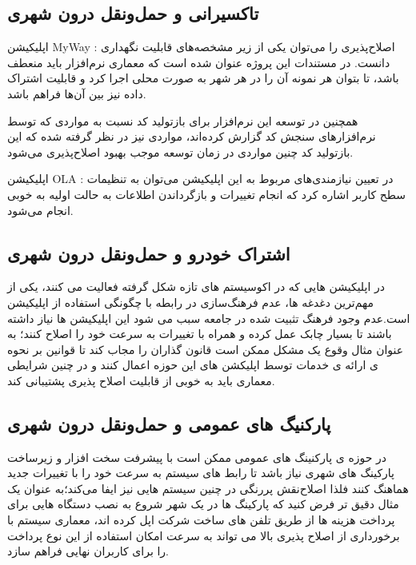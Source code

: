 \subsection{تاکسیرانی و حمل‌و‌نقل درون شهری}

اپلیکیشن MyWay : اصلاح‌پذیری را می‌توان یکی از زیر مشخصه‌های قابلیت‌‌ نگهداری دانست. در مستندات این پروژه عنوان شده است که معماری نرم‌افزار باید منعطف باشد، تا بتوان هر نمونه آن را در هر شهر به صورت محلی اجرا کرد و قابلیت اشتراک داده نیز بین آن‌‌ها فراهم باشد. 

همچنین در توسعه این نرم‌افزار برای باز‌تولید کد نسبت به مواردی که توسط نرم‌افزارهای سنجش کد گزارش کرده‌اند، مواردی نیز در نظر گرفته شده که این باز‌تولید کد چنین مواردی در زمان توسعه موجب بهبود اصلاح‌پذیری می‌شود.

اپلیکیشن OLA : در تعیین نیازمندی‌های مربوط به این اپلیکیشن می‌توان به تنظیمات سطح کاربر اشاره کرد که انجام تغییرات و بازگرداندن اطلاعات به حالت اولیه به خوبی انجام می‌شود.


\subsection{اشتراک خودرو و حمل‌و‌نقل درون شهری}
در اپلیکیشن هایی که در اکوسیستم های تازه شکل گرفته فعالیت می کنند، یکی از مهم‌ترین دغدغه ها، عدم فرهنگ‌سازی در رابطه با چگونگی استفاده از اپلیکیشن است.عدم وجود فرهنگ تثبیت شده در جامعه سبب می شود این اپلیکیشن ها نیاز داشته باشند تا بسیار چابک عمل کرده و همراه با تغییرات به سرعت خود را اصلاح کنند؛ به عنوان مثال وقوع یک مشکل ممکن است قانون گذاران را مجاب کند تا قوانین بر نحوه ی ارائه ی خدمات توسط اپلیکشن های این حوزه اعمال کنند و در چنین شرایطی معماری باید به خوبی از قابلیت اصلاح پذیری پشتیبانی کند.
\subsection{پارکنیگ های عمومی و حمل‌و‌نقل درون شهری}
در حوزه ی پارکنینگ های عمومی ممکن است با پیشرفت سخت افزار و زیر‌ساخت پارکینگ های شهری نیاز باشد تا رابط های سیستم به سرعت خود را با تغییرات جدید هماهنگ کنند فلذا اصلاح‌نقش پررنگی در چنین سیستم هایی نیز ایفا می‌کند؛به عنوان یک مثال دقیق تر فرض کنید که پارکینگ ها در یک شهر شروع به نصب دستگاه هایی برای پرداخت هزینه ها از طریق تلفن های ساخت شرکت اپل کرده اند، معماری سیستم با برخورداری از اصلاح پذیری بالا می تواند به سرعت امکان استفاده از این نوع پرداخت را برای کاربران نهایی فراهم سازد.